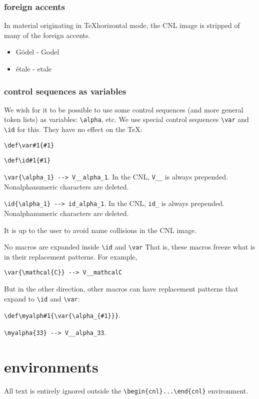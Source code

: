 \documentclass[12pt]{amsart}
\begin{document}
\subsubsection{foreign accents}

In material originating in \TeX horizontal mode, 
the CNL image is
stripped of many of the foreign accents.

\begin{itemize}
\item G\"odel - Godel
\item \'etale - etale
\end{itemize}

\subsubsection{control sequences as variables}

We wish for it to be possible to use some control sequences (and more general token lists)
as variables: \verb!\alpha!, etc.
We use special control sequences \verb!\var! and \verb!\id! for this.
They have no effect on the \TeX:

\verb!\def\var#1{#1}!

\verb!\def\id#1{#1}!

\verb!\var{\alpha_1} --> V__alpha_1!. In the CNL, \verb!V__! is always prepended.  Nonalphanumeric
characters are deleted.

\verb!\id{\alpha_1} --> id_alpha_1!.  In the CNL, \verb!id_! is always prepended. Nonalphanumeric
characters are deleted.

It is up to the user to avoid name collisions in the CNL image.

No macros are expanded inside \verb!\id! and \verb!\var!  That is, these macros freeze what is in their
replacement patterns.   
For example,

\verb!\var{\mathcal{C}} --> V__mathcalC!

But in the other direction, other macros can have replacement patterns that
expand to \verb!\id! and \verb!\var!:

\verb!\def\myalph#1{\var{\alpha_{#1}}}!.

\verb!\myalpha{33} --> V__alpha_33!.


\section{environments}

All text is entirely ignored outside the
\verb!\begin{cnl}...\end{cnl}! environment.
\end{document}
